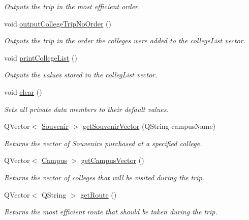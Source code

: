 \begin{DoxyCompactItemize}
\begin{DoxyCompactList}\small\item\em Outputs the trip in the most efficient order. \end{DoxyCompactList}\item 
void \hyperlink{class_trip_a9ab6ed89354dcf98f5207e5213328826}{output\+College\+Trip\+No\+Order} ()
\begin{DoxyCompactList}\small\item\em Outputs the trip in the order the colleges were added to the college\+List vector. \end{DoxyCompactList}\item 
void \hyperlink{class_trip_a96259feb01ba260ca35d52e7bd59c25e}{print\+College\+List} ()
\begin{DoxyCompactList}\small\item\em Outputs the values stored in the colleg\+List vector. \end{DoxyCompactList}\item 
void \hyperlink{class_trip_a16ab50d2755e1f61ed8c661d33e19362}{clear} ()
\begin{DoxyCompactList}\small\item\em Sets all private data members to their default values. \end{DoxyCompactList}\item 
Q\+Vector$<$ \hyperlink{class_souvenir}{Souvenir} $>$ \hyperlink{class_trip_ae4f0f1e7b633d20e4f1e5522ad990546}{get\+Souvenir\+Vector} (Q\+String campus\+Name)
\begin{DoxyCompactList}\small\item\em Returns the vector of Souvenirs purchased at a specified college. \end{DoxyCompactList}\item 
Q\+Vector$<$ \hyperlink{class_campus}{Campus} $>$ \hyperlink{class_trip_afb76381fc49c04660a203d8a5de70983}{get\+Campus\+Vector} ()
\begin{DoxyCompactList}\small\item\em Returns the vector of colleges that will be visited during the trip. \end{DoxyCompactList}\item 
Q\+Vector$<$ Q\+String $>$ \hyperlink{class_trip_a61d4bb1ca70f99d64d2ce0eae7424c5a}{get\+Route} ()
\begin{DoxyCompactList}\small\item\em Returns the most efficient route that should be taken during the trip. \end{DoxyCompactList}\end{DoxyCompactItemize}
